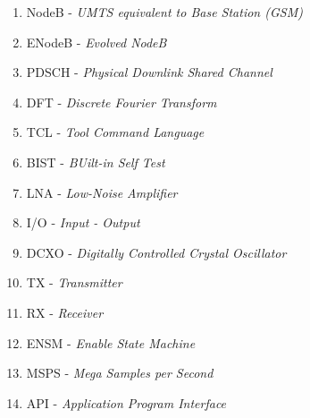 \begin{enumerate}
	\item NodeB - \textit{UMTS equivalent to Base Station (GSM)}
	\item ENodeB - \textit{Evolved NodeB}
	\item PDSCH - \textit{Physical Downlink Shared Channel}
	\item DFT - \textit{Discrete Fourier Transform}
	\item TCL - \textit{Tool Command Language}
	\item BIST - \textit{BUilt-in Self Test}
	\item LNA - \textit{Low-Noise Amplifier}
	\item I/O - \textit{Input - Output}
	\item DCXO - \textit{Digitally Controlled Crystal Oscillator}
	\item TX - \textit{Transmitter}
	\item RX - \textit{Receiver}
	\item ENSM - \textit{Enable State Machine}
	\item MSPS - \textit{Mega Samples per Second}
	\item API - \textit{Application Program Interface}
\end{enumerate}
